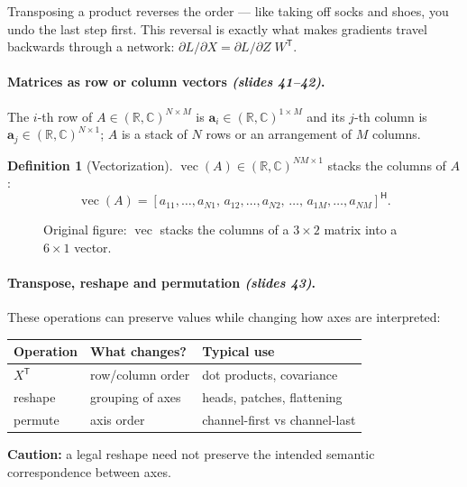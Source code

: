 \documentclass[11pt,a4paper]{article}
\newcommand{\R}{\mathbb{R}}
\newcommand{\C}{\mathbb{C}}
\newcommand{\T}{^{\mathsf{T}}}
\newcommand{\Her}{^{\mathsf{H}}}
\newcommand{\vecop}{\operatorname{vec}}
\newcommand{\slides}[1]{\texorpdfstring{\emph{(slides #1)}}{(slides #1)}}
\theoremstyle{definition}
\newtheorem{definition}{Definition}[section]
\theoremstyle{plain}
\begin{document}
\begin{intuition}
Transposing a product reverses the order --- like taking off socks and shoes, you undo the last step first. This reversal is exactly what makes gradients travel backwards through a network: $\partial L/\partial X=\partial L/\partial Z\;W\T$.
\end{intuition}

\paragraph{Matrices as row or column vectors \slides{41--42}.}
The $i$-th row of $A\in(\R,\C)^{N\times M}$ is $\mathbf a_i\in(\R,\C)^{1\times M}$ and its $j$-th column is $\mathbf a_j\in(\R,\C)^{N\times1}$; $A$ is a stack of $N$ rows or an arrangement of $M$ columns.

\begin{definition}[Vectorization]
$\vecop(A)\in(\R,\C)^{NM\times1}$ stacks the columns of $A$:
\[
\vecop(A)=[a_{11},\dots,a_{N1},\,a_{12},\dots,a_{N2},\,\dots,\,a_{1M},\dots,a_{NM}]\Her .
\]
\end{definition}

\begin{figure}[ht]
\centering
{}
\caption{Original figure: $\vecop$ stacks the columns of a $3\times2$ matrix into a $6\times1$ vector.}
\end{figure}

\paragraph{Transpose, reshape and permutation \slides{43}.} These operations can preserve values while changing how axes are interpreted:
\begin{center}
\small
\begin{tabular}{@{}lll@{}}
\toprule
Operation & What changes? & Typical use\\\midrule
$X\T$ & row/column order & dot products, covariance\\
reshape & grouping of axes & heads, patches, flattening\\
permute & axis order & channel-first vs channel-last\\\bottomrule
\end{tabular}
\end{center}
\textbf{Caution:} a legal reshape need not preserve the intended semantic correspondence between axes.
\end{document}
